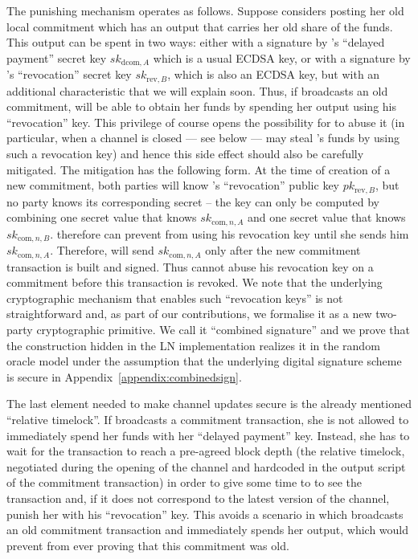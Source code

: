     The punishing mechanism operates as follows. Suppose \alice{} considers
    posting her old local commitment which has an output that carries her old
    share of the funds. This output can be spent in two ways: either with a
    signature by \alice's ``delayed payment'' secret key $sk_{\mathrm{dcom}, A}$
    which is a usual ECDSA key, or with a signature by \bob's ``revocation''
    secret key $sk_{\mathrm{rev}, B}$, which is also an ECDSA key, but with an
    additional characteristic that we will explain soon. Thus, if \alice{}
    broadcasts an old commitment, \bob{} will be able to obtain her funds by
    spending her output using his ``revocation'' key. This privilege of course
    opens the possibility for \bob{} to abuse it (in particular, when a channel
    is closed --- see below --- \bob{} may steal \alice's funds by using such a
    revocation key) and hence this side effect should also be carefully
    mitigated. The mitigation has the following form. At the time of creation of
    a new commitment, both parties will know \bob's ``revocation'' public key
    $pk_{\mathrm{rev}, B}$, but no party knows its corresponding secret -- the
    key can only be computed by combining one secret value that \alice{} knows
    $sk_{\mathrm{com}, n, A}$ and one secret value that \bob{} knows
    $sk_{\mathrm{com}, n, B}$. \alice{} therefore can prevent \bob{} from using
    his revocation key until she sends him $sk_{\mathrm{com}, n, A}$. Therefore,
    \alice{} will send \bob{} $sk_{\mathrm{com}, n, A}$ only after the new
    commitment transaction is built and signed. Thus \bob{} cannot abuse his
    revocation key on a commitment before this transaction is revoked. We note
    that the underlying cryptographic mechanism  that enables such ``revocation
    keys'' is not straightforward and, as part of our contributions, we
    formalise it as a new two-party cryptographic primitive. We call it
    ``combined signature'' and we prove that the construction hidden in the LN
    implementation realizes it in the random oracle model under the assumption
    that the underlying digital signature scheme is secure in
    Appendix~\ref{appendix:combinedsign}.

    The last element needed to make channel updates secure is the already
    mentioned ``relative timelock''. If \alice{} broadcasts a commitment
    transaction, she is not allowed to immediately spend her funds with her
    ``delayed payment'' key. Instead, she has to wait for the transaction to
    reach a pre-agreed block depth (the relative timelock, negotiated during
    the opening of the channel and hardcoded in the output script of the
    commitment transaction) in order to give some time to \bob{} to see the
    transaction and, if it does not correspond to the latest version of the
    channel, punish her with his ``revocation'' key. This avoids a scenario in
    which \alice{} broadcasts an old commitment transaction and immediately
    spends her output, which would prevent \bob{} from ever proving that this
    commitment was old.

